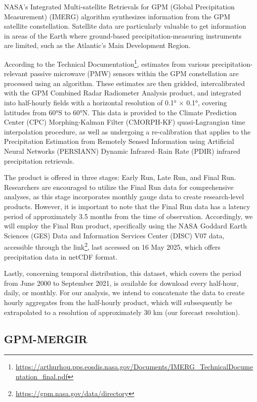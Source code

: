 NASA’s Integrated Multi-satellite Retrievals for GPM (Global Precipitation Measurement) (IMERG) \cite{huffman2019gpm} algorithm synthesizes information from the GPM satellite constellation. Satellite data are particularly valuable to get information in areas of the Earth where ground-based precipitation-measuring instruments are limited, such as the Atlantic’s Main Development Region.

According to the Technical Documentation\footnote{\url{https://arthurhou.pps.eosdis.nasa.gov/Documents/IMERG_TechnicalDocumentation_final.pdf}}, estimates from various precipitation-relevant passive microwave (PMW) sensors within the GPM constellation are processed using an algorithm. These estimates are then gridded, intercalibrated with the GPM Combined Radar Radiometer Analysis product, and integrated into half-hourly fields with a horizontal resolution of 0.1° × 0.1°, covering latitudes from 60°S to 60°N. This data is provided to the Climate Prediction Center (CPC) Morphing-Kalman Filter (CMORPH-KF) quasi-Lagrangian time interpolation procedure, as well as undergoing a re-calibration that applies to the Precipitation Estimation from Remotely Sensed Information using Artificial Neural Networks (PERSIANN) Dynamic Infrared–Rain Rate (PDIR) infrared precipitation retrievals.

The product is offered in three stages: Early Run, Late Run, and Final Run. Researchers are encouraged to utilize the Final Run data for comprehensive analyses, as this stage incorporates monthly gauge data to create research-level products. However, it is important to note that the Final Run data has a latency period of approximately 3.5 months from the time of observation. Accordingly, we will employ the Final Run product, specifically using the NASA Goddard Earth Sciences (GES) Data and Information Services Center (DISC) V07 data, accessible through the link\footnote{\url{https://gpm.nasa.gov/data/directory}}, last accessed on 16 May 2025, which offers precipitation data in netCDF format.

Lastly, concerning temporal distribution, this dataset, which covers the period from June 2000 to September 2021, is available for download every half-hour, daily, or monthly. For our analysis, we intend to concatenate the data to create hourly aggregates from the half-hourly product, which will subsequently be extrapolated to a resolution of approximately 30 km (our forecast resolution).


\subsection{GPM-MERGIR}

